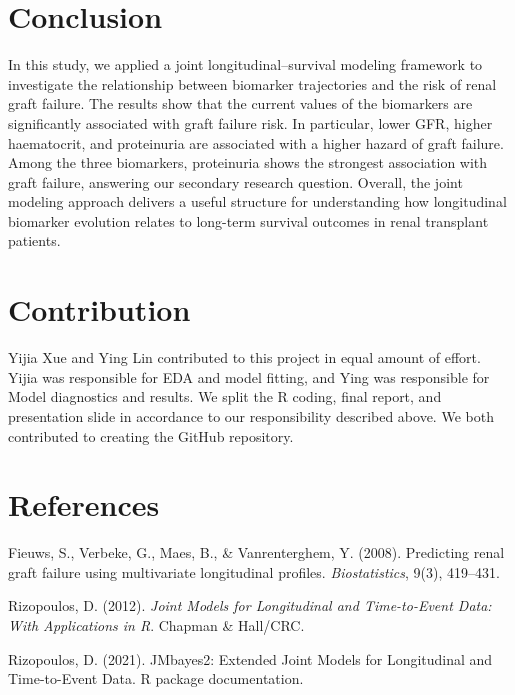 \documentclass[11pt]{article}
\begin{document}
\section{Conclusion}
In this study, we applied a joint longitudinal–survival modeling framework to investigate the relationship between biomarker trajectories and the risk of renal graft failure. The results show that the current values of the biomarkers are significantly associated with graft failure risk. In particular, lower GFR, higher haematocrit, and proteinuria are associated with a higher hazard of graft failure. Among the three biomarkers, proteinuria shows the strongest association with graft failure, answering our secondary research question. Overall, the joint modeling approach delivers a useful structure for understanding how longitudinal biomarker evolution relates to long-term survival outcomes in renal transplant patients.

\section*{Contribution}
Yijia Xue and Ying Lin contributed to this project in equal amount of effort. Yijia was responsible for EDA and model fitting, and Ying was responsible for Model diagnostics and results. We split the R coding, final report, and presentation slide in accordance to our responsibility described above. We both contributed to creating the GitHub repository.

\section*{References}

Fieuws, S., Verbeke, G., Maes, B., \& Vanrenterghem, Y. (2008).
Predicting renal graft failure using multivariate longitudinal profiles.
\textit{Biostatistics}, 9(3), 419–431.

Rizopoulos, D. (2012).
\textit{Joint Models for Longitudinal and Time-to-Event Data: With Applications in R}.
Chapman \& Hall/CRC.

Rizopoulos, D. (2021).
JMbayes2: Extended Joint Models for Longitudinal and Time-to-Event Data.
R package documentation.
\end{document}
